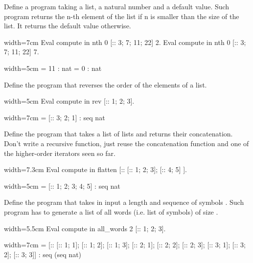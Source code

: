 \begin{Exercise}[label=ex:nth,difficulty=0,title={Find the n-th element}]
Define a program taking a list, a natural number and a default value.  Such
program returns the n-th element of the list if n is smaller than the size of
the list.  It returns the default value otherwise.

\begin{coq}{}{width=7cm}
Eval compute in
  nth 0 [:: 3; 7; 11; 22] 2.
Eval compute in
  nth 0 [:: 3; 7; 11; 22] 7.
\end{coq}
\begin{coqout}{}{width=5cm}
     = 11
     : nat
     = 0
     : nat
\end{coqout}
\end{Exercise}

\begin{Exercise}[label=ex:rev,difficulty=0,title={List reversal}]
Define the program  that reverses the order of the elements
of a list. 

\begin{coq}{}{width=5cm}
Eval compute in
  rev [:: 1; 2; 3].
\end{coq}
\begin{coqout}{}{width=7cm}
 = [:: 3; 2; 1]
 : seq nat
\end{coqout}
\end{Exercise}

\begin{Exercise}[label=ex:flatten,difficulty=1,title={List flattening}]
Define the program  that takes a list of lists and returns
their concatenation.  Don't write a recursive function, just reuse
the concatenation function and one of the higher-order iterators
seen so far.

\begin{coq}{}{width=7.3cm}
Eval compute in
  flatten [:: [:: 1; 2; 3]; [:: 4; 5] ].
\end{coq}
\begin{coqout}{}{width=5cm}
 = [:: 1; 2; 3; 4; 5]
 : seq nat
\end{coqout}
\end{Exercise}


\begin{Exercise}[label=ex:allwords,difficulty=2,title={All words of size n}]
Define the  program that takes in input a
length  and sequence of symbols .
Such program has to generate a list of all words (i.e. list
of symbols) of size .

\begin{coq}{}{width=5.5cm}
Eval compute in
  all_words 2 [:: 1; 2; 3].
\end{coq}
\begin{coqout}{}{width=7cm}
 = [:: [:: 1; 1]; [:: 1; 2]; [:: 1; 3];
       [:: 2; 1]; [:: 2; 2]; [:: 2; 3];
       [:: 3; 1]; [:: 3; 2]; [:: 3; 3]]
 : seq (seq nat)
\end{coqout}
\end{Exercise}

